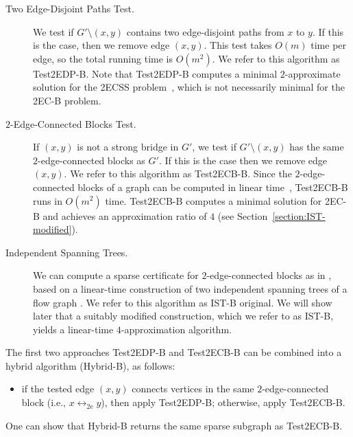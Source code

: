 \documentclass[11pt]{article}
\begin{document}
\begin{description}
  \item[Two Edge-Disjoint Paths Test.]
    We test if $G' \setminus (x,y)$ contains two edge-disjoint paths from $x$ to $y$.
    If this is the case, then we remove edge $(x,y)$.
    This test takes $O(m)$ time per edge, so the total running time is $O(m^2)$.
    We refer to this algorithm as \textsf{Test2EDP-B}.
    Note that \textsf{Test2EDP-B} computes a minimal $2$-approximate solution for the \textsf{2ECSS} problem~\cite{CT00}, which is not necessarily minimal for the \textsf{2EC-B} problem.

  \item[$2$-Edge-Connected Blocks Test.]
    If $(x,y)$ is not a strong bridge in $G'$, we test if $G' \setminus (x,y)$ has the same $2$-edge-connected blocks as $G'$. If this is the case then we remove edge $(x,y)$.
    We refer to this algorithm as \textsf{Test2ECB-B}.
    Since the $2$-edge-connected blocks of a graph can be computed in linear time~\cite{2ECB}, \textsf{Test2ECB-B} runs in $O(m^2)$ time.
    \textsf{Test2ECB-B} computes a minimal solution for \textsf{2EC-B} and achieves an approximation ratio of $4$ (see Section~\ref{section:IST-modified}).

  \item[Independent Spanning Trees.]
    We can compute a sparse certificate for $2$-edge-connected blocks as in \cite{2ECB}, based on a linear-time construction of two independent spanning trees of a flow graph \cite{domv:gt05,domcert}.
    We refer to this algorithm as \textsf{IST-B original}.
    We will show later that a suitably modified construction, which we refer to as \textsf{IST-B}, yields a linear-time $4$-approximation algorithm.
\end{description}
The first two approaches \textsf{Test2EDP-B} and \textsf{Test2ECB-B} can be combined into a hybrid algorithm (\textsf{Hybrid-B}),  as follows:
\begin{itemize}
\item if the tested edge $(x,y)$ connects vertices in the same $2$-edge-connected block
(i.e., $x\leftrightarrow_{\mathrm{2e}} y$), then apply \textsf{Test2EDP-B}; otherwise, apply  \textsf{Test2ECB-B}.
\end{itemize}
One can show that \textsf{Hybrid-B} returns the same sparse subgraph as \textsf{Test2ECB-B}.
\end{document}
